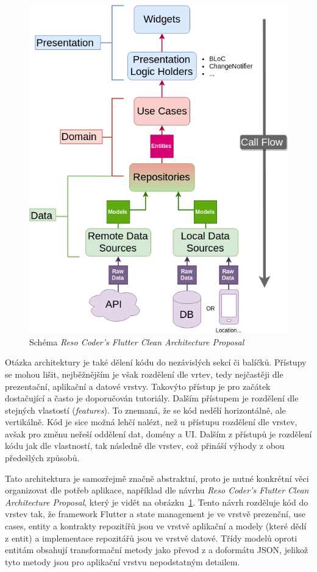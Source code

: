 \begin{figure}[t!]
    \centering
    \includegraphics[width=0.7\linewidth]{assets/technology-research/architecture/reso-coder-clean-architecture.png}
    \caption{Schéma \emph{Reso Coder's Flutter Clean Architecture Proposal}~\cite{the_clean_architecture}}
    \label{fig:reso_coder_clean_architecture}
\end{figure}

Otázka architektury je také dělení kódu do nezávislých sekcí či balíčků.
Přístupy se mohou lišit,
nejběžnějším je však rozdělení dle vrtev,
tedy nejčastěji dle prezentační, aplikační a datové vrstvy.
Takovýto přístup je pro začátek dostačující a často je doporučován tutoriály.
Dalším přístupem je rozdělení dle stejných vlastostí (\emph{features}).
To znemaná,
že se kód nedělí horizontálně,
ale vertikálně.
Kód je sice možná lehčí nalézt,
než u přístupu rozdělení dle vrstev,
avšak pro změnu neřeší oddělení dat, domény a UI.
Dalším z přístupů je rozdělení kódu jak dle vlastností,
tak následně dle vrstev,
což přináší výhody z obou předešlých
způsobů.~\cite[kapitola 34]{the_clean_architecture}

Tato architektura je samozřejmě značně abstraktní,
proto je nutné konkrétní věci organizovat dle potřeb aplikace,
například dle návrhu \emph{Reso Coder's Flutter Clean Architecture Proposal},
který je vidět na obrázku~\ref{fig:reso_coder_clean_architecture}.
Tento návrh rozděluje kód do vrstev tak,
že framework Flutter a state management je ve vrstvě prezenční,
use cases, entity a kontrakty repozitířů jsou ve vrstvě aplikační
a modely (které dědí z entit) a implementace repozitářů jsou ve vrstvě datové.
Třídy modelů oproti entitám obsahují transformační metody jako
převod z a doformátu JSON,
jelikož tyto metody jsou pro aplikační vrstvu nepodstatným
detailem.~\cite{reso_coder_clean_architecture}


